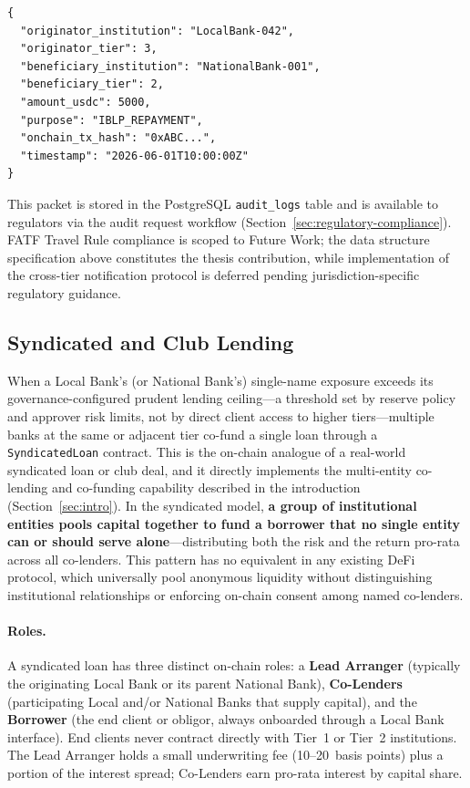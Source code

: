 \documentclass[12pt,a4paper]{report}
\begin{document}
\begin{verbatim}
{
  "originator_institution": "LocalBank-042",
  "originator_tier": 3,
  "beneficiary_institution": "NationalBank-001",
  "beneficiary_tier": 2,
  "amount_usdc": 5000,
  "purpose": "IBLP_REPAYMENT",
  "onchain_tx_hash": "0xABC...",
  "timestamp": "2026-06-01T10:00:00Z"
}
\end{verbatim}

This packet is stored in the PostgreSQL \texttt{audit\_logs} table and is available to regulators via the audit request workflow (Section~\ref{sec:regulatory-compliance}). FATF Travel Rule compliance is scoped to Future Work; the data structure specification above constitutes the thesis contribution, while implementation of the cross-tier notification protocol is deferred pending jurisdiction-specific regulatory guidance.

\subsection{Syndicated and Club Lending}
\label{sec:syndicated-lending}

When a Local Bank's (or National Bank's) single-name exposure exceeds its governance-configured prudent lending ceiling---a threshold set by reserve policy and approver risk limits, not by direct client access to higher tiers---multiple banks at the same or adjacent tier co-fund a single loan through a \texttt{SyndicatedLoan} contract. This is the on-chain analogue of a real-world syndicated loan or club deal, and it directly implements the multi-entity co-lending and co-funding capability described in the introduction (Section~\ref{sec:intro}). In the syndicated model, \textbf{a group of institutional entities pools capital together to fund a borrower that no single entity can or should serve alone}---distributing both the risk and the return pro-rata across all co-lenders. This pattern has no equivalent in any existing DeFi protocol, which universally pool anonymous liquidity without distinguishing institutional relationships or enforcing on-chain consent among named co-lenders.

\paragraph{Roles.}
A syndicated loan has three distinct on-chain roles: a \textbf{Lead Arranger} (typically the originating Local Bank or its parent National Bank), \textbf{Co-Lenders} (participating Local and/or National Banks that supply capital), and the \textbf{Borrower} (the end client or obligor, always onboarded through a Local Bank interface). End clients never contract directly with Tier~1 or Tier~2 institutions. The Lead Arranger holds a small underwriting fee (10--20~basis points) plus a portion of the interest spread; Co-Lenders earn pro-rata interest by capital share.
\end{document}
